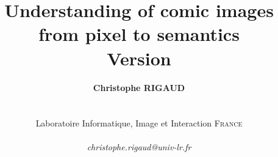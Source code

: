 \documentclass[a4paper,14pt]{book}
\begin{document}
\author{
\textbf{Christophe RIGAUD}\\
~\\ ~\\
Laboratoire Informatique, Image et Interaction \textsc{France}\\
~\\
\textit{christophe.rigaud@univ-lr.fr}\\
}

\title{
\textbf{\huge Understanding of comic images from pixel to semantics}
\\
Version 
}


\thispagestyle{empty}

\pagestyle{fancy}





\newpage
\thispagestyle{empty}
\newpage $\ $
\newpage
\thispagestyle{empty}

\end{document}
